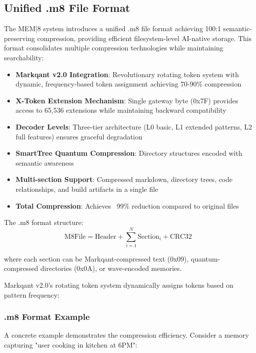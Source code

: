 \documentclass[11pt,letterpaper]{article}
\begin{document}
\subsection{Unified .m8 File Format}

The MEM|8 system introduces a unified .m8 file format achieving 100:1 semantic-preserving compression, providing efficient filesystem-level AI-native storage. This format consolidates multiple compression technologies while maintaining searchability:

\begin{itemize}
\item \textbf{Markqant v2.0 Integration}: Revolutionary rotating token system with dynamic, frequency-based token assignment achieving 70-90\% compression
\item \textbf{X-Token Extension Mechanism}: Single gateway byte (0x7F) provides access to 65,536 extensions while maintaining backward compatibility
\item \textbf{Decoder Levels}: Three-tier architecture (L0 basic, L1 extended patterns, L2 full features) ensures graceful degradation
\item \textbf{SmartTree Quantum Compression}: Directory structures encoded with semantic awareness
\item \textbf{Multi-section Support}: Compressed markdown, directory trees, code relationships, and build artifacts in a single file
\item \textbf{Total Compression}: Achieves ~99\% reduction compared to original files
\end{itemize}

The .m8 format structure:
\begin{equation}
\text{M8File} = \text{Header} + \sum_{i=1}^{N} \text{Section}_i + \text{CRC32}
\end{equation}

where each section can be Markqant-compressed text (0x09), quantum-compressed directories (0x0A), or wave-encoded memories.

Markqant v2.0's rotating token system dynamically assigns tokens based on pattern frequency:

\subsubsection{.m8 Format Example}

A concrete example demonstrates the compression efficiency. Consider a memory capturing "user cooking in kitchen at 6PM":
\end{document}
